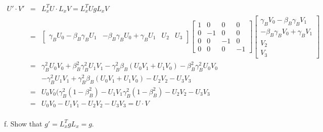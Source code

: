 \documentclass[11pt]{amsart}
\begin{document}
\begin{eqnarray*} 
U'\cdot{V'} &=& L_{x}^{T}U\cdot{L_{x}V} = L_{x}^{T}UgL_{x}V \\
&=& \begin{bmatrix}
	\gamma_{B}U_{0}-\beta_{B}\gamma_{B}U_{1} & -\beta_{B}\gamma_{B}U_{0}+\gamma_{B}U_{1} & U_{2} & U_{3} 
\end{bmatrix}\begin{bmatrix}
	1 & 0 & 0 & 0 \\
	0 & -1 & 0 & 0 \\
	0 & 0 & -1 & 0 \\
	0 & 0 & 0 & -1 
	\end{bmatrix}\begin{bmatrix}
	\gamma_{B}V_{0}-\beta_{B}\gamma_{B}V_{1} \\
	-\beta_{B}\gamma_{B}V_{0}+\gamma_{B}V_{1} \\
	V_{2} \\
	V_{3}
	\end{bmatrix} \\
&=& \gamma_{B}^{2}U_{0}V_{0}+\beta_{B}^{2}\gamma_{B}^{2}U_{1}V_{1}-\gamma_{B}^{2}\beta_{B}(U_{0}V_{1}+U_{1}V_{0})-\beta_{B}^{2}\gamma_{B}^{2}U_{0}V_{0} \\
& & -\gamma_{B}^{2}U_{1}V_{1}+\gamma_{B}^{2}\beta_{B}(U_{0}V_{1}+U_{1}V_{0})-U_{2}V_{2}-U_{3}V_{3} \\
&=& U_{0}V_{0}(\gamma_{B}^{2}(1-\beta_{B}^{2})-U_{1}V_{1}\gamma_{B}^{2}(1-\beta_{B}^{2})-U_{2}V_{2}-U_{3}V_{3} \\
&=& U_{0}V_{0}-U_{1}V_{1}-U_{2}V_{2}-U_{3}V_{3} = U\cdot{V} 
\end{eqnarray*} \\
f. Show that $g'=L_{x}^{T}gL_{x}=g$. \\
\end{document}
